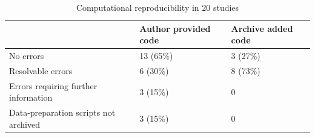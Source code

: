\begin{table}

\caption{Computational reproducibility in 20 studies}
\centering
\begin{tabular}[t]{lll}
\toprule
  & Author provided code & Archive added code\\
\midrule
No errors & 13 (65\%) & 3 (27\%)\\
Resolvable errors & 6 (30\%) & 8 (73\%)\\
Errors requiring further information & 3 (15\%) & 0\\
Data-preparation scripts not archived & 3 (15\%) & 0\\
\bottomrule
\end{tabular}
\end{table}
